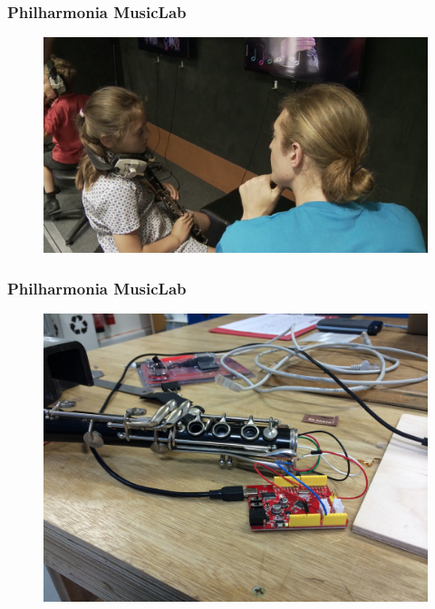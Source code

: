\begin{frame}
	\frametitle{Philharmonia MusicLab}

	\begin{figure}
		\includegraphics[scale=.5]{assets/musiclab_01}
	\end{figure}

\end{frame}


\begin{frame}
	\frametitle{Philharmonia MusicLab}

	\begin{figure}
		\includegraphics[scale=.08]{assets/musiclab_02}
	\end{figure}

\end{frame}


